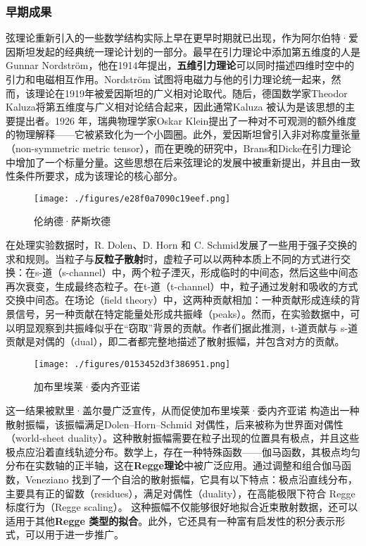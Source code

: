 \subsubsection{早期成果}
弦理论重新引入的一些数学结构实际上早在更早时期就已出现，作为阿尔伯特·爱因斯坦发起的经典统一理论计划的一部分。最早在引力理论中添加第五维度的人是Gunnar Nordström，他在1914年提出，\textbf{五维引力理论}可以同时描述四维时空中的引力和电磁相互作用。Nordström 试图将电磁力与他的引力理论统一起来，然而，该理论在1919年被爱因斯坦的广义相对论取代。随后，德国数学家Theodor Kaluza将第五维度与广义相对论结合起来，因此通常Kaluza 被认为是该思想的主要提出者。1926 年，瑞典物理学家Oskar Klein提出了一种对不可观测的额外维度的物理解释——它被紧致化为一个小圆圈。此外，爱因斯坦曾引入非对称度量张量（non-symmetric metric tensor），而在更晚的研究中，Brans和Dicke在引力理论中增加了一个标量分量。这些思想在后来弦理论的发展中被重新提出，并且由一致性条件所要求，成为该理论的核心部分。
\begin{figure}[ht]
\centering
\texttt{[image: ./figures/e28f0a7090c19eef.png]}
\caption{伦纳德·萨斯坎德} \label{fig_String_14}
\end{figure}
在处理实验数据时，R. Dolen、D. Horn 和 C. Schmid发展了一些用于强子交换的求和规则。当粒子与\textbf{反粒子散射}时，虚粒子可以以两种本质上不同的方式进行交换：在s-道（s-channel）中，两个粒子湮灭，形成临时的中间态，然后这些中间态再次衰变，生成最终态粒子。在t-道（t-channel）中，粒子通过发射和吸收的方式交换中间态。在场论（field theory）中，这两种贡献相加：一种贡献形成连续的背景信号，另一种贡献在特定能量处形成共振峰（peaks）。然而，在实验数据中，可以明显观察到共振峰似乎在“窃取”背景的贡献。作者们据此推测，t-道贡献与 s-道贡献是对偶的（dual），即二者都完整地描述了散射振幅，并包含对方的贡献。
\begin{figure}[ht]
\centering
\texttt{[image: ./figures/0153452d3f386951.png]}
\caption{加布里埃莱·委内齐亚诺} \label{fig_String_15}
\end{figure}
这一结果被默里·盖尔曼广泛宣传，从而促使加布里埃莱·委内齐亚诺 构造出一种散射振幅，该振幅满足Dolen–Horn–Schmid 对偶性，后来被称为世界面对偶性（world-sheet duality）。这种散射振幅需要在粒子出现的位置具有极点，并且这些极点应沿着直线轨迹分布。数学上，存在一种特殊函数——伽马函数，其极点均匀分布在实数轴的正半轴，这在\textbf{Regge理论}中被广泛应用。通过调整和组合伽马函数，Veneziano 找到了一个自洽的散射振幅，它具有以下特点：极点沿直线分布，主要具有正的留数（residues），满足对偶性（duality），在高能极限下符合 Regge 标度行为（Regge scaling）。 这种振幅不仅能够很好地拟合近束散射数据，还可以适用于其他\textbf{Regge 类型的拟合}。此外，它还具有一种富有启发性的积分表示形式，可以用于进一步推广。

